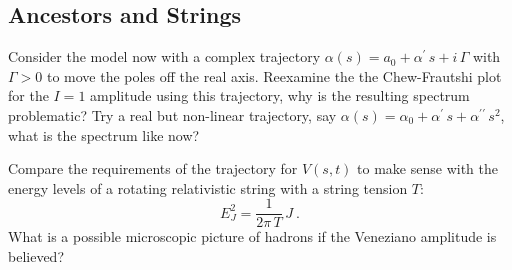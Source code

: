 \subsection{Ancestors and Strings}
Consider the model now with a complex trajectory $\alpha(s) = a_0 + \alpha^\prime \, s + i \,\Gamma$ with $\Gamma > 0$ to move the poles off the real axis. Reexamine the the Chew-Frautshi plot for the $I=1$ amplitude using this trajectory, why is the resulting spectrum problematic? Try a real but non-linear trajectory, say $\alpha(s) = \alpha_0 + \alpha^\prime \, s + \alpha^{\prime\prime} \, s^2$, what is the spectrum like now?

Compare the requirements of the trajectory for $V(s,t)$ to make sense with the energy levels of a rotating relativistic string with a string tension $T$:
    \begin{equation}
        E_J^2 = \frac{1}{2\pi \, T} \, J ~.
    \end{equation}
What is a possible microscopic picture of hadrons if the Veneziano amplitude is believed? 